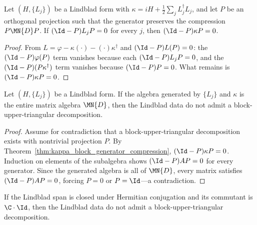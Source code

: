 \begin{theorem}%
    \label{thm:kappa_block_generator_compression}
    \leanok
    Let $(H,\{L_j\})$ be a Lindblad form with
    $\kappa=iH+\tfrac{1}{2}\sum_jL_j^\dagger L_j$, and let $P$ be an
    orthogonal projection such that the generator preserves the compression
    $P\MN{D}P$.
    If $(\Id-P)L_jP=0$ for every $j$, then $(\Id-P)\kappa P=0$.
\end{theorem}

\begin{proof}\leanok
    From $L=\varphi-\kappa(\cdot)-(\cdot)\kappa^\dagger$ and
    $(\Id-P)L(P)=0$: the $(\Id-P)\varphi(P)$ term vanishes because each
    $(\Id-P)L_jP=0$, and the $(\Id-P)(P\kappa^\dagger)$ term vanishes
    because $(\Id-P)P=0$. What remains is $(\Id-P)\kappa P=0$.
\end{proof}

\begin{theorem}%
    \label{thm:full_algebra_gen_no_block_ut}
    \leanok
    Let $(H,\{L_j\})$ be a Lindblad form.
    If the algebra generated by $\{L_j\}$ and $\kappa$ is the entire
    matrix algebra $\MN{D}$, then the Lindblad data do not admit a
    block-upper-triangular decomposition.
\end{theorem}

\begin{proof}\leanok
    Assume for contradiction that a block-upper-triangular decomposition
    exists with nontrivial projection $P$.
    By Theorem~\ref{thm:kappa_block_generator_compression},
    $(\Id-P)\kappa P=0$.
    Induction on elements of the subalgebra shows
    $(\Id-P)AP=0$ for every generator. Since the generated algebra is
    all of $\MN{D}$, every matrix satisfies $(\Id-P)AP=0$, forcing
    $P=0$ or $P=\Id$---a contradiction.
\end{proof}

\begin{theorem}%
    \label{thm:herm_span_trivial_commutant_no_block_ut}
    \leanok
    If the Lindblad span is closed under Hermitian conjugation and its
    commutant is $\C\cdot\Id$, then the Lindblad data do not admit a
    block-upper-triangular decomposition.
\end{theorem}

